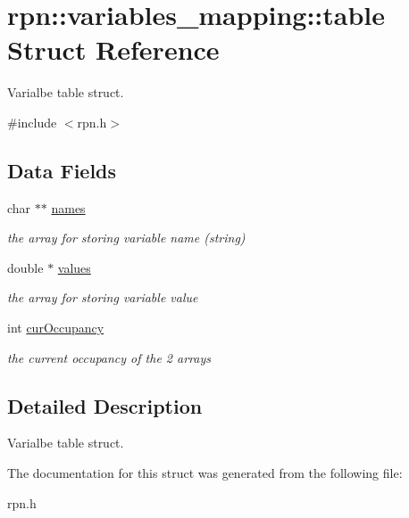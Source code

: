 \hypertarget{structrpn_1_1variables__mapping_1_1table}{\section{rpn\-:\-:variables\-\_\-mapping\-:\-:table Struct Reference}
\label{structrpn_1_1variables__mapping_1_1table}
}


Varialbe table struct.  




{\ttfamily \#include $<$rpn.\-h$>$}

\subsection*{Data Fields}
\begin{DoxyCompactItemize}
\item 
\hypertarget{structrpn_1_1variables__mapping_1_1table_a26fc633cf551a2621e172633486c85ef}{char $\ast$$\ast$ \hyperlink{structrpn_1_1variables__mapping_1_1table_a26fc633cf551a2621e172633486c85ef}{names}}\label{structrpn_1_1variables__mapping_1_1table_a26fc633cf551a2621e172633486c85ef}

\begin{DoxyCompactList}\small\item\em the array for storing variable name (string) \end{DoxyCompactList}\item 
\hypertarget{structrpn_1_1variables__mapping_1_1table_a2098158062e3e63fce7d2575b324c386}{double $\ast$ \hyperlink{structrpn_1_1variables__mapping_1_1table_a2098158062e3e63fce7d2575b324c386}{values}}\label{structrpn_1_1variables__mapping_1_1table_a2098158062e3e63fce7d2575b324c386}

\begin{DoxyCompactList}\small\item\em the array for storing variable value \end{DoxyCompactList}\item 
\hypertarget{structrpn_1_1variables__mapping_1_1table_aef8007b712486b5acb83207b52671d1e}{int \hyperlink{structrpn_1_1variables__mapping_1_1table_aef8007b712486b5acb83207b52671d1e}{cur\-Occupancy}}\label{structrpn_1_1variables__mapping_1_1table_aef8007b712486b5acb83207b52671d1e}

\begin{DoxyCompactList}\small\item\em the current occupancy of the 2 arrays \end{DoxyCompactList}\end{DoxyCompactItemize}


\subsection{Detailed Description}
Varialbe table struct. 

The documentation for this struct was generated from the following file\-:\begin{DoxyCompactItemize}
\item 
rpn.\-h\end{DoxyCompactItemize}
